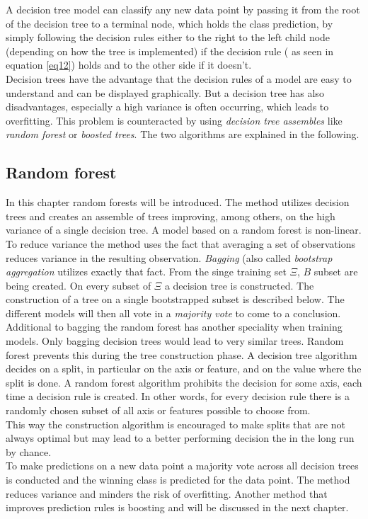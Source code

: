 A decision tree model can classify any new data point by passing it from the root of the decision tree to a terminal node, which holds the class prediction, by simply following the decision rules either to the right to the left child node (depending on how the tree is implemented) if the decision rule ( as seen in equation \ref{eq12}) holds and to the other side if it doesn't.\\
Decision trees have the advantage that the decision rules of a model are easy to understand and can be displayed graphically. 
But a decision tree has also disadvantages, especially a high variance is often occurring, which leads to overfitting. This problem is counteracted by using \emph{decision tree assembles} like \emph{random forest} or \emph{boosted trees}. The two algorithms are explained in the following.

\subsection{Random forest}

In this chapter random forests will be introduced. The method utilizes decision trees and creates an assemble of trees improving, among others, on the high variance of a single decision tree. 
A model based on a random forest is non-linear.
\\
To reduce variance the method uses the fact that averaging a set of observations reduces variance in the resulting observation.
\emph{Bagging} (also called \emph{bootstrap aggregation} utilizes exactly that fact. From the singe training set $\Xi$, $B$ subset are being created. On every subset of $\Xi$ a decision tree is constructed. The construction of a tree on a single bootstrapped subset is described below. The different models will then all vote in a \emph{majority vote} to come to a conclusion.
\\
Additional to bagging the random forest has another speciality when training models. Only bagging decision trees would lead to very similar trees.
Random forest prevents this during the tree construction phase. A decision tree algorithm decides on a split, in particular on the axis or feature, and on the value where the split is done. A random forest algorithm prohibits the decision for some axis, each time a decision rule is created. In other words, for every decision rule there is a randomly chosen subset of all axis or features possible to choose from.\\
This way the construction algorithm is encouraged to make splits that are not always optimal but may lead to a better performing decision the in the long run by chance.
\\
To make predictions on a new data point  a majority vote across all decision trees is conducted and the winning class is predicted for the data point.
The method reduces variance and minders the risk of overfitting. Another method that improves prediction rules is boosting and will be discussed in the next chapter.

